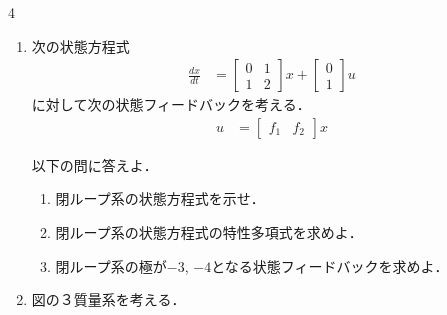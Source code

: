 \documentclass[fleqn]{article}
\renewcommand{\bmatrix}{\left[\begin{array}}
\newcommand{\ematrix}{\end{array}\right]}
\begin{document}
\begin{multicols}{4}
\begin{enumerate}





\item
次の状態方程式
\begin{align}
	\frac{dx}{dt} 
	& =	\bmatrix{rr}
			0 & 1 \\
			1 & 2
		\ematrix
		x
		+
		\bmatrix{c}
			0 \\
			1
		\ematrix
		u 
\nonumber
\end{align}
に対して次の状態フィードバックを考える．
\begin{align}
	u & = \bmatrix{cc} f_1 & f_2 \ematrix x
\nonumber
\end{align}

以下の問に答えよ．
\begin{enumerate}
\item
閉ループ系の状態方程式を示せ．
\vspace{4cm}

\item
閉ループ系の状態方程式の特性多項式を求めよ．
\vspace{5cm}

\item
閉ループ系の極が$-3$, $-4$となる状態フィードバックを求めよ．
\vspace{6cm}

\end{enumerate}




\item

図の３質量系を考える．
\begin{center}
\end{center}


\end{enumerate}
\end{multicols}
\end{document}

